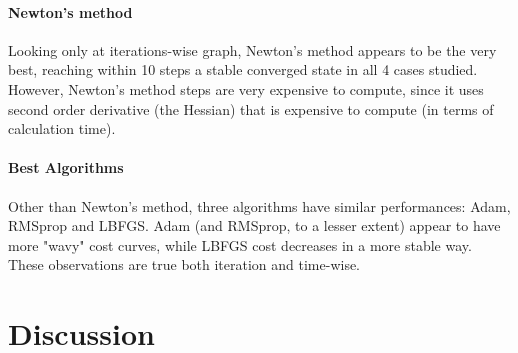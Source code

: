 \documentclass[a4paper]{article}
\begin{document}
	\paragraph{Newton's method}
	Looking only at iterations-wise graph, Newton's method appears to be the very best, reaching within 10 steps a stable converged state in all 4 cases studied.
	However, Newton's method steps are very expensive to compute, since it uses second order derivative (the Hessian) that is expensive to compute (in terms of calculation time).
	
	\paragraph{Best Algorithms}
	Other than Newton's method, three algorithms have similar performances: Adam, RMSprop and LBFGS.
	Adam (and RMSprop, to a lesser extent) appear to have more "wavy" cost curves, while LBFGS cost decreases in a more stable way.
	These observations are true both iteration and time-wise.
	
	
	
	\section{Discussion}
	
	
	
	
\end{document}
